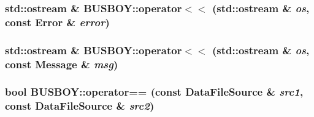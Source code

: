 \label{namespaceBUSBOY_a37db6513c53aae204080d673cf0fe9ac}
\hypertarget{namespaceBUSBOY_abf725420838926e6e0be40f6be286e1e}{
\subsubsection[{operator$<$$<$}]{\setlength{\rightskip}{0pt plus 5cm}std::ostream \& BUSBOY::operator$<$$<$ (std::ostream \& {\em os}, \/  const Error \& {\em error})}}
\label{namespaceBUSBOY_abf725420838926e6e0be40f6be286e1e}
\hypertarget{namespaceBUSBOY_aa34993c405d596f786e60c5e28227ee0}{
\subsubsection[{operator$<$$<$}]{\setlength{\rightskip}{0pt plus 5cm}std::ostream \& BUSBOY::operator$<$$<$ (std::ostream \& {\em os}, \/  const Message \& {\em msg})}}
\label{namespaceBUSBOY_aa34993c405d596f786e60c5e28227ee0}
\hypertarget{namespaceBUSBOY_a1a5eaeb88615f0cf63f6d095afa22001}{
\subsubsection[{operator==}]{\setlength{\rightskip}{0pt plus 5cm}bool BUSBOY::operator== (const DataFileSource \& {\em src1}, \/  const DataFileSource \& {\em src2})}}
\label{namespaceBUSBOY_a1a5eaeb88615f0cf63f6d095afa22001}


